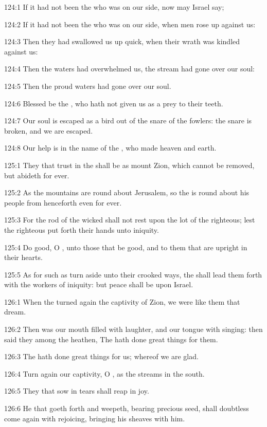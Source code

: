 124:1 If it had not been the \LORD who was on our side, now may Israel say;

124:2 If it had not been the \LORD who was on our side, when men rose up against us:

124:3 Then they had swallowed us up quick, when their wrath was kindled against us:

124:4 Then the waters had overwhelmed us, the stream had gone over our soul:

124:5 Then the proud waters had gone over our soul.

124:6 Blessed be the \LORD, who hath not given us as a prey to their teeth.

124:7 Our soul is escaped as a bird out of the snare of the fowlers: the snare is broken, and we are escaped.

124:8 Our help is in the name of the \LORD, who made heaven and earth.



125:1 They that trust in the \LORD shall be as mount Zion, which cannot be removed, but abideth for ever.

125:2 As the mountains are round about Jerusalem, so the \LORD is round about his people from henceforth even for ever.

125:3 For the rod of the wicked shall not rest upon the lot of the righteous; lest the righteous put forth their hands unto iniquity.

125:4 Do good, O \LORD, unto those that be good, and to them that are upright in their hearts.

125:5 As for such as turn aside unto their crooked ways, the \LORD shall lead them forth with the workers of iniquity: but peace shall be upon Israel.



126:1 When the \LORD turned again the captivity of Zion, we were like them that dream.

126:2 Then was our mouth filled with laughter, and our tongue with singing: then said they among the heathen, The \LORD hath done great things for them.

126:3 The \LORD hath done great things for us; whereof we are glad.

126:4 Turn again our captivity, O \LORD, as the streams in the south.

126:5 They that sow in tears shall reap in joy.

126:6 He that goeth forth and weepeth, bearing precious seed, shall doubtless come again with rejoicing, bringing his sheaves with him.




